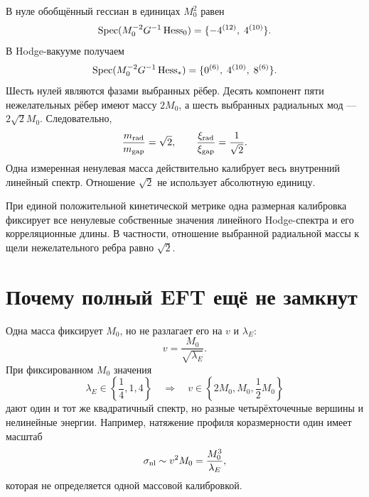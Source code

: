 В нуле обобщённый гессиан в единицах $M_0^2$ равен
\begin{equation}
 \operatorname{Spec}(M_0^{-2}G^{-1}\operatorname{Hess}_0)
 =\{-4^{(12)},\;4^{(10)}\}.
 \label{eq:v7-single-scale-origin-spectrum}
\end{equation}
В Hodge-вакууме получаем
\begin{equation}
 \operatorname{Spec}(M_0^{-2}G^{-1}\operatorname{Hess}_*)
 =\{0^{(6)},\;4^{(10)},\;8^{(6)}\}.
 \label{eq:v7-single-scale-vacuum-spectrum}
\end{equation}
Шесть нулей являются фазами выбранных рёбер. Десять компонент пяти
нежелательных рёбер имеют массу $2M_0$, а шесть выбранных радиальных мод ---
$2\sqrt2M_0$. Следовательно,
\begin{equation}
 \frac{m_{\rm rad}}{m_{\rm gap}}=\sqrt2,
 \qquad
 \frac{\xi_{\rm rad}}{\xi_{\rm gap}}=\frac1{\sqrt2}.
 \label{eq:v7-single-scale-linear-ratios}
\end{equation}
Одна измеренная ненулевая масса действительно калибрует весь внутренний
линейный спектр. Отношение $\sqrt2$ не использует абсолютную единицу.

\begin{theorem}
При единой положительной кинетической метрике одна размерная калибровка
фиксирует все ненулевые собственные значения линейного Hodge-спектра и его
корреляционные длины. В частности, отношение выбранной радиальной массы к
щели нежелательного ребра равно $\sqrt2$.
\end{theorem}

\section{Почему полный EFT ещё не замкнут}

Одна масса фиксирует $M_0$, но не разлагает его на $v$ и $\lambda_E$:
\begin{equation}
 v=\frac{M_0}{\sqrt{\lambda_E}}.
 \label{eq:v7-single-scale-vev-coupling-degeneracy}
\end{equation}
При фиксированном $M_0$ значения
\begin{equation}
 \lambda_E\in\left\{\frac14,1,4\right\}
 \quad\Longrightarrow\quad
 v\in\left\{2M_0,M_0,\frac12M_0\right\}
 \label{eq:v7-single-scale-degeneracy-example}
\end{equation}
дают один и тот же квадратичный спектр, но разные четырёхточечные вершины и
нелинейные энергии. Например, натяжение профиля коразмерности один имеет
масштаб
\begin{equation}
 \sigma_{\rm nl}\sim v^2M_0=\frac{M_0^3}{\lambda_E},
 \label{eq:v7-single-scale-nonlinear-energy}
\end{equation}
которая не определяется одной массовой калибровкой.

